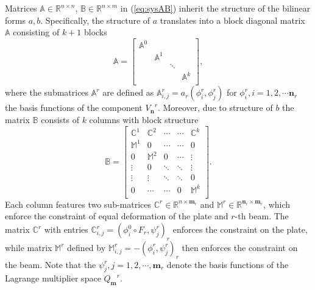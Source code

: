 \documentclass{marine_2015}
\newcommand{\Amat}{\ensuremath{\mathbb{A}}}
\newcommand{\Bmat}{\ensuremath{\mathbb{B}}}
\newcommand{\rinner}[2]{\ensuremath{\left(#1, #2\right)_r}}
\newcommand{\arinner}[2]{\ensuremath{a_r\left(#1, #2\right)}}
\newcommand{\Vh}{\ensuremath{V_{\mathbf{n}}}}
\newcommand{\Qh}{\ensuremath{Q_{\mathbf{m}}}}
\begin{document}
Matrices $\Amat\in\mathbb{R}^{n\times n}$, $\Bmat\in\mathbb{R}^{n\times m}$ in
(\ref{eq:sysAB}) inherit the structure of the bilinear forms $a, b$. Specifically, 
the structure of $a$ translates into a block diagonal matrix $\Amat$ consisting of
$k+1$ blocks
\[
    \mathbb{A}=
    \begin{bmatrix}
      \mathbb{A}^0  &   &  &\\
                    & \mathbb{A}^1 &  &\\
                    &   &   \ddots    & \\
                    &   &   & \mathbb{A}^k\\
    \end{bmatrix},
\]
where the submatrices $\mathbb{A}^r$ are defined as $\mathbb{A}^r_{i,
j}=\arinner{\phi^r_i}{\phi^r_j}$ for $\phi^r_i, i=1, 2, \cdots \mathbf{n}_r$ the
basis functions of the component $\Vh^r$. Moreover, due to structure of $b$ the 
matrix $\Bmat$ consists of $k$ columns with block structure
\[
    \mathbb{B}=
    \begin{bmatrix}
      \mathbb{C}^1 & \mathbb{C}^2 & \cdots & \cdots & \mathbb{C}^k\\
      \mathbb{M}^1   &        0       & \cdots & \cdots &        0      \\
           0         & \mathbb{M}^2   &    0   & \cdots &   \vdots      \\
         \vdots      &       0        & \ddots & \ddots &   \vdots      \\
         \vdots      &     \vdots      & \ddots & \ddots &       0      \\
      0         &  \cdots        & \cdots & 0      &   \mathbb{M}^k     \\
    \end{bmatrix}.
\]
Each column features two sub-matrices
$\mathbb{C}^r\in\mathbb{R}^{n\times\mathbf{m}_r}$ and
$\mathbb{M}^r\in\mathbb{R}^{\mathbf{n}_r\times\mathbf{m}_r}$, which enforce the
constraint of equal deformation of the plate and $r$-th beam. The matrix
$\mathbb{C}^r$ with entries $\mathbb{C}^r_{i, j} = \rinner{\phi^0_i\circ F_r}{\psi^r_j}$ 
enforces the constraint on the plate, while matrix $\mathbb{M}^r$ defined by
$\mathbb{M}^r_{i, j}=-\rinner{\phi^r_i}{\psi^r_j}$ then enforces the constraint
on the beam. Note that the $\psi^r_j, j=1, 2,\cdots,\mathbf{m}_r$ denote the basis
functions of the Lagrange multiplier space $\Qh^r$.
\end{document}
